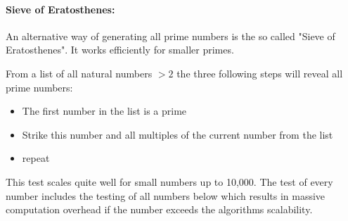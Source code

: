 

\paragraph{Sieve of Eratosthenes:}
An alternative way of generating all prime numbers is the so called "Sieve of Eratosthenes". It works efficiently for smaller primes.

From a list of all natural numbers $> 2$ the three following steps will reveal all prime numbers:

\begin{itemize}%
   \item The first number in the list is a prime
   \item Strike this number and all multiples of the current number from the list
   \item repeat  
\end{itemize}%

This test scales quite well for small numbers up to 10,000. The test of every number includes the testing of all numbers below which results in massive computation overhead if the number exceeds the algorithms scalability.

